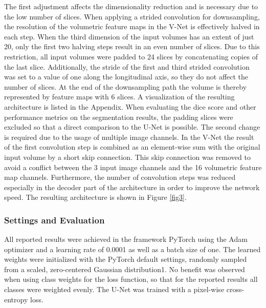 \documentclass[10pt,letterpaper]{article}
\begin{document}
	
	The first adjustment affects the dimensionality reduction and is necessary due to the low number of slices. When applying a strided convolution for downsampling, the resolution of the volumetric feature maps in the V-Net is effectively halved in each step. When the third dimension of the input volumes has an extent of just 20, only the first two halving steps result in an even number of slices. Due to this restriction, all input volumes were padded to 24 slices by concatenating copies of the last slice. Additionally, the stride of the first and third strided convolution was set to a value of one along the longitudinal axis, so they do not affect the number of slices. At the end of the downsampling path the volume is thereby represented by feature maps with 6 slices. A visualization of the resulting architecture is listed in the Appendix. When evaluating the dice score and other performance metrics on the segmentation results, the padding slices were excluded so that a direct comparison to the U-Net is possible. The second change is required due to the usage of multiple image channels. In the V-Net the result of the first convolution step is combined as an element-wise sum with the original input volume by a short skip connection. This skip connection was removed to avoid a conflict between the 3 input image channels and the 16 volumetric feature map channels. Furthermore, the number of convolution steps was reduced especially in the decoder part of the architecture in order to improve the network speed. The resulting architecture is shown in Figure \ref{fig3}.
	
	
	
	
	
	\subsubsection*{Settings and Evaluation}
	All reported results were achieved in the framework PyTorch using the Adam optimizer \cite{kingma2014adam} and a learning rate of 0.0001 as well as a batch size of one. The learned weights were initialized with the PyTorch default settings, randomly sampled from a scaled, zero-centered Gaussian distribution1. No benefit was observed when using class weights for the loss function, so that for the reported results all classes were weighted evenly. The U-Net was trained with a pixel-wise cross-entropy loss. \\

	
		
\end{document}

